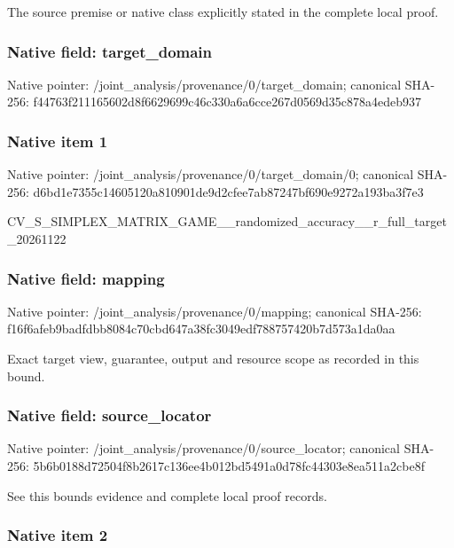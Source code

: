 \documentclass[10pt,a4paper]{article}
\begin{document}
The source premise or native class explicitly stated in the complete local proof.


\subsubsection{Native field: target\_domain}


Native pointer: /joint\_analysis/provenan\allowbreak{}ce/0/target\_domain; canonical SHA-256: f44763f211165602d8f66296\allowbreak{}99c46c330a6a6cce267d0569\allowbreak{}d35c878a4edeb937



\subsubsection{Native item 1}


Native pointer: /joint\_analysis/provenan\allowbreak{}ce/0/target\_domain/0; canonical SHA-256: d6bd1e7355c14605120a8109\allowbreak{}01de9d2cfee7ab87247bf690\allowbreak{}e9272a193ba3f7e3


CV\_S\_SIMPLEX\_MATRIX\_GAME\allowbreak{}\_\_randomized\_accuracy\_\_r\allowbreak{}\_full\_target\_20261122


\subsubsection{Native field: mapping}


Native pointer: /joint\_analysis/provenance/0/mapping; canonical SHA-256: f16f6afeb9badfdbb8084c70\allowbreak{}cbd647a38fc3049edf788757\allowbreak{}420b7d573a1da0aa


Exact target view, guarantee, output and resource scope as recorded in this bound.


\subsubsection{Native field: source\_locator}


Native pointer: /joint\_analysis/provenan\allowbreak{}ce/0/source\_locator; canonical SHA-256: 5b6b0188d72504f8b2617c13\allowbreak{}6ee4b012bd5491a0d78fc443\allowbreak{}03e8ea511a2cbe8f


See this bounds evidence and complete local proof records.


\subsubsection{Native item 2}
\end{document}
